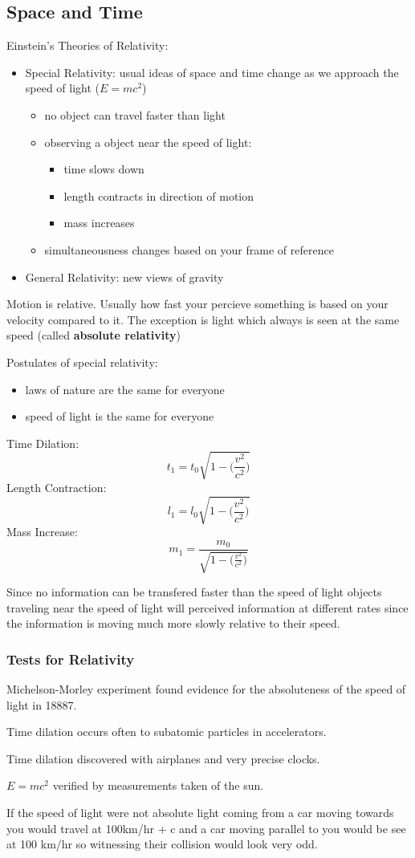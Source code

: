 \subsection{Space and Time}
Einstein's Theories of Relativity:
\begin{itemize}
\item Special Relativity: usual ideas of space and time change as we approach the speed of light ($E = mc^2$)
\begin{itemize}
\item no object can travel faster than light
\item observing a object near the speed of light:
\begin{itemize}
\item time slows down
\item length contracts in direction of motion
\item mass increases
\end{itemize}
\item simultaneousness changes based on your frame of reference
\end{itemize}
\item General Relativity: new views of gravity
\end{itemize}

Motion is relative. Usually how fast your percieve something is based on your velocity compared to it. The exception is light which always is seen at the same speed (called \textbf{absolute relativity})

Postulates of special relativity:
\begin{itemize}
\item laws of nature are the same for everyone
\item speed of light is the same for everyone
\end{itemize}

Time Dilation: \[ t_1 = t_0\sqrt{1-\bigg(\frac{v^2}{c^2}\bigg)} \]
Length Contraction: \[ l_1 = l_0\sqrt{1-\bigg(\frac{v^2}{c^2}\bigg)} \]
Mass Increase: \[ m_1 = \frac{m_0}{\sqrt{1-\bigg(\frac{v^2}{c^2}\bigg)}} \]

Since no information can be transfered faster than the speed of light objects traveling near the speed of light will perceived information at different rates since the information is moving much more slowly relative to their speed.

\subsubsection{Tests for Relativity}
Michelson-Morley experiment found evidence for the absoluteness of the speed of light in 18887.

Time dilation occurs often to subatomic particles in accelerators.

Time dilation discovered with airplanes and very precise clocks.

$E = mc^2$ verified by measurements taken of the sun.

If the speed of light were not absolute light coming from a car moving towards you would travel at 100km/hr + c and a car moving parallel to you would be see at 100 km/hr so witnessing their collision would look very odd.
